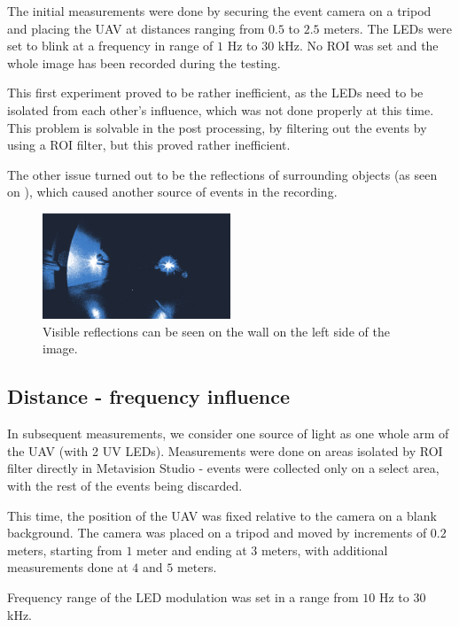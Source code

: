The initial measurements were done by securing the event camera on a tripod and placing the UAV at distances ranging from
$0.5$ to $2.5$ meters. The LEDs were set to blink at a frequency in range of $1$ Hz to $30$ kHz. No \ac{ROI} was set
and the whole image has been recorded during the testing.

This first experiment proved to be rather inefficient, as the LEDs need to be isolated from each other's influence, which
was not done properly at this time. This problem is solvable in the post processing, by filtering out the events
by using a ROI filter, but this proved rather inefficient.

The other issue turned out to be the reflections of surrounding objects (as seen on ), which caused
another source of events in the recording.

\begin{figure}[htbp]
  \centering
  \includegraphics[width=0.5\textwidth]{./fig/photos/meas1.png}
  \caption{Visible reflections can be seen on the wall on the left side of the image.}
  \label{fig:meas1}
\end{figure}

\subsection{Distance - frequency influence}

In subsequent measurements, we consider one source of light as one whole arm of the UAV (with 2 UV LEDs). Measurements were
done on areas isolated by ROI filter directly in Metavision Studio - events were collected only on a select area, with the
rest of the events being discarded.

This time, the position of the UAV was fixed relative to the camera on a blank background. The camera was placed on a tripod
and moved by increments of $0.2$ meters, starting from $1$ meter and ending at $3$ meters, with additional measurements done
at $4$ and $5$ meters.

Frequency range of the LED modulation was set in a range from $10$ Hz to $30$ kHz.

